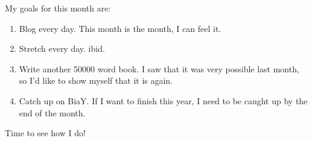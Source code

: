 \documentclass[12pt]{article}[titlepage]
\renewcommand{\,}{\textsuperscript{,}}
\begin{document}
My goals for this month are:
\begin{enumerate}
\item Blog every day. This month is the month, I can feel it.
\item Stretch every day. ibid.
\item Write another 50000 word book. I saw that it was very possible last month, so I'd like to show myself that it is again.
\item Catch up on BiaY. If I want to finish this year, I need to be caught up by the end of the month.
\end{enumerate}
Time to see how I do!
\end{document}
